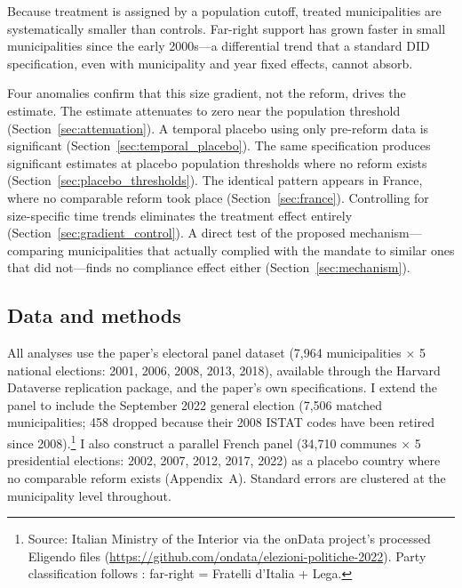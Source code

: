 \documentclass[12pt,letterpaper]{article}
\begin{document}
Because treatment is assigned by a population cutoff, treated municipalities are systematically smaller than controls. Far-right support has grown faster in small municipalities since the early 2000s---a differential trend that a standard DID specification, even with municipality and year fixed effects, cannot absorb.

Four anomalies confirm that this size gradient, not the reform, drives the estimate. The estimate attenuates to zero near the population threshold (Section~\ref{sec:attenuation}). A temporal placebo using only pre-reform data is significant (Section~\ref{sec:temporal_placebo}). The same specification produces significant estimates at placebo population thresholds where no reform exists (Section~\ref{sec:placebo_thresholds}). The identical pattern appears in France, where no comparable reform took place (Section~\ref{sec:france}). Controlling for size-specific time trends eliminates the treatment effect entirely (Section~\ref{sec:gradient_control}). A direct test of the proposed mechanism---comparing municipalities that actually complied with the mandate to similar ones that did not---finds no compliance effect either (Section~\ref{sec:mechanism}).

\subsection{Data and methods}

All analyses use the paper's electoral panel dataset (7,964 municipalities $\times$ 5 national elections: 2001, 2006, 2008, 2013, 2018), available through the Harvard Dataverse replication package, and the paper's own specifications. I extend the panel to include the September 2022 general election (7,506 matched municipalities; 458 dropped because their 2008 ISTAT codes have been retired since 2008).\footnote{Source: Italian Ministry of the Interior via the onData project's processed Eligendo files (\url{https://github.com/ondata/elezioni-politiche-2022}). Party classification follows \citet{cremaschi2024}: far-right = Fratelli d'Italia + Lega.} I also construct a parallel French panel (34,710 communes $\times$ 5 presidential elections: 2002, 2007, 2012, 2017, 2022) as a placebo country where no comparable reform exists (Appendix~A). Standard errors are clustered at the municipality level throughout.
\end{document}
